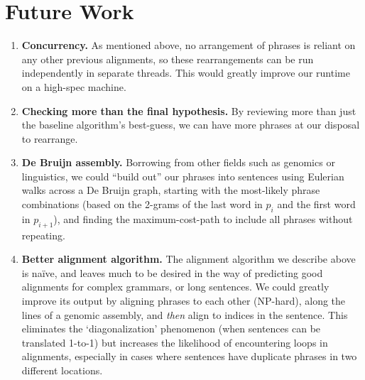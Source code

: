 \documentclass[a4paper]{article}
\begin{document}
\section{Future Work}

\begin{enumerate}
    \item \textbf{Concurrency.} As mentioned above, no arrangement of phrases is reliant on any other previous alignments, so these rearrangements can be run independently in separate threads. This would greatly improve our runtime on a high-spec machine.
    \item \textbf{Checking more than the final hypothesis.} By reviewing more than just the baseline algorithm's best-guess, we can have more phrases at our disposal to rearrange.
    \item \textbf{De Bruijn assembly.} Borrowing from other fields such as genomics or linguistics, we could ``build out'' our phrases into sentences using Eulerian walks across a De Bruijn graph, starting with the most-likely phrase combinations (based on the 2-grams of the last word in $p_i$ and the first word in $p_{i+1}$), and finding the maximum-cost-path to include all phrases without repeating.
    \item \textbf{Better alignment algorithm.} The alignment algorithm we describe above is naïve, and leaves much to be desired in the way of predicting good alignments for complex grammars, or long sentences. We could greatly improve its output by aligning phrases to each other (NP-hard), along the lines of a genomic assembly, and \textit{then} align to indices in the sentence. This eliminates the `diagonalization' phenomenon (when sentences can be translated 1-to-1) but increases the likelihood of encountering loops in alignments, especially in cases where sentences have duplicate phrases in two different locations.
\end{enumerate}
\end{document}
